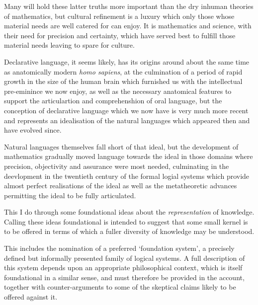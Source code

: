 Many will hold these latter truths more important than the dry inhuman theories of mathematics, but cultural refinement is a luxury which only those whose material needs are well catered for can enjoy.
It is mathematics and science, with their need for precision and certainty, which have served best to fulfill those material needs leaving to spare for culture.


Declarative language, it seems likely, has its origins around about the same time as anatomically modern \emph{homo sapiens}, at the culmination of a period of rapid growth in the size of the human brain which furnished us with the intellectual pre-eminince we now enjoy, as well as the necessary anatomical features to support the articulartion and comprehenshion of oral language, but the conception of declarative language which we now have is very much more recent and represents an idealisation of the natural languages which appeared then and have evolved since.

Natural languages themselves fall short of that ideal, but the development of mathematics gradually moved language towards the ideal in those domains where precision, objectivity and assurance were most needed, culminating in the deevlopment in the twentieth century of the formal logial systems which provide almost perfect realisations of the ideal as well as the metatheoretic advances permitting the ideal to be fully articulated. 

This I do through some foundational ideas about the \emph{representation} of knowledge.
Calling these ideas foundational is intended to suggest that some small kernel is to be offered in terms of which a fuller diversity of knowledge may be understood.

This includes the nomination of a preferred `foundation system', a precisely defined but informally presented family of logical systems.
A full description of this system depends upon an appropriate philosophical context, which is itself foundational in a similar sense, and must therefore be provided in the account, together with counter-arguments to some of the skeptical claims likely to be offered against it.

